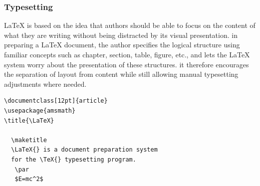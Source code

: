 \subsubsection{Typesetting}
\LaTeX{} is based on the idea that authors should be able to focus on 
the content of what they are writing without being distracted by its 
visual presentation. in preparing a \LaTeX{} document, the author 
specifies the logical structure using familiar concepts such as 
chapter, section, table, figure, etc., and lets the \LaTeX{} system 
worry about the presentation of these structures. it therefore 
encourages the separation of layout from content while still allowing 
manual typesetting adjustments where needed. 

\begin{verbatim}
\documentclass[12pt]{article}
\usepackage{amsmath}
\title{\LaTeX}

  \maketitle 
  \LaTeX{} is a document preparation system 
  for the \TeX{} typesetting program.
   \par 
   $E=mc^2$

\end{verbatim}

